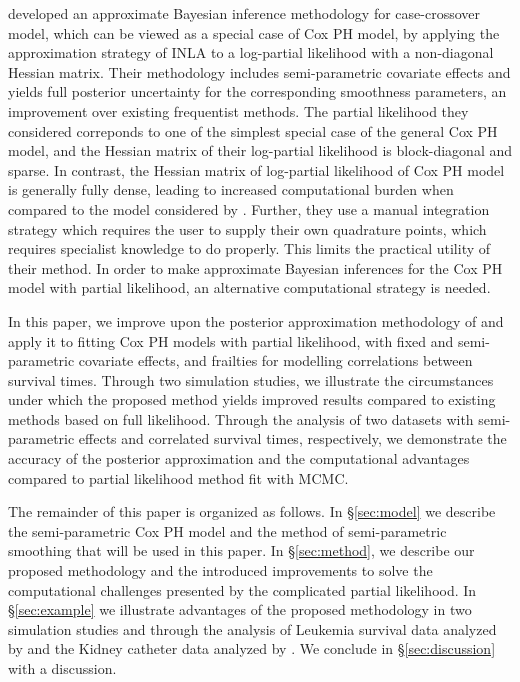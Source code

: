 \documentclass[ba]{imsart}
\begin{document}
\cite{casecross} developed an approximate Bayesian inference methodology for case-crossover model, which can be viewed as a special case of Cox PH model, by applying the approximation strategy of INLA to a log-partial likelihood with a non-diagonal Hessian matrix. 
Their methodology includes semi-parametric covariate effects and yields full posterior uncertainty for the corresponding smoothness parameters, an improvement over existing frequentist methods. The partial likelihood they considered correponds to one of the simplest special case of the general Cox PH model, and the Hessian matrix of their log-partial likelihood is block-diagonal and sparse. In contrast, the Hessian matrix of log-partial likelihood of Cox PH model is generally fully dense, leading to increased computational burden when compared to the model considered by \cite{casecross}. Further, they use a manual integration strategy which requires the user to supply their own quadrature points, which requires specialist knowledge to do properly. This limits the practical utility of their method. In order to make approximate Bayesian inferences for the Cox PH model with partial likelihood, an alternative computational strategy is needed.



In this paper, we improve upon the posterior approximation methodology of \cite{casecross} and apply it to fitting Cox PH models with partial likelihood, with fixed and semi-parametric covariate effects, and frailties for modelling correlations between survival times. Through two simulation studies, we illustrate the circumstances under which the proposed method yields improved results compared to existing methods based on full likelihood. Through the analysis of two datasets with semi-parametric effects and correlated survival times, respectively, we demonstrate the accuracy of the posterior approximation and the computational advantages compared to partial likelihood method fit with MCMC.


The remainder of this paper is organized as follows. In \S\ref{sec:model} we describe the semi-parametric Cox PH model and the method of semi-parametric smoothing that will be used in this paper. In \S\ref{sec:method}, we describe our proposed methodology and the introduced improvements to solve the computational challenges presented by the complicated partial likelihood. In \S\ref{sec:example} we illustrate advantages of the proposed methodology in two simulation studies and through the analysis of Leukemia survival data analyzed by \cite{inlacoxph} and the Kidney catheter data analyzed by \cite{kidney}. We conclude in \S\ref{sec:discussion} with a discussion.
\end{document}
